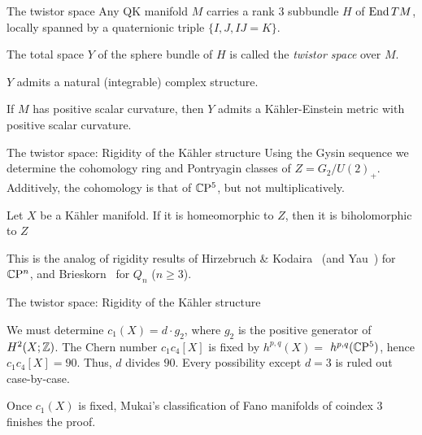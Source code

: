 \documentclass[11pt,parskip]{beamer}
\begin{document}
\begin{frame}{The twistor space}
	Any QK manifold $M$ carries a rank 3 subbundle $H$ of $\operatorname{End} TM$, locally spanned by a quaternionic triple $\{I,J,IJ=K\}$.\pause
	
	\medskip
	
	\begin{mydef}
		The total space $Y$ of the sphere bundle of $H$ is called the \emph{twistor space} over $M$.
	\end{mydef}\pause

	\medskip
	
	\begin{thm}
		\begin{numberedlist}
			\item $Y$ admits a natural (integrable) complex structure.
			\item If $M$ has positive scalar curvature, then $Y$ admits a K\"ahler-Einstein metric with positive scalar curvature.
		\end{numberedlist}
	\end{thm}	
\end{frame}

\begin{frame}{The twistor space: Rigidity of the K\"ahler structure}
	Using the Gysin sequence we determine the cohomology ring and Pontryagin classes of $Z=G_2/U(2)_+$. Additively, the cohomology is that of $\mathbb{C}\mathrm{P}^5$, but not multiplicatively.\pause
	
	\bigskip 
	
	\begin{thm}
		Let $X$ be a K\"ahler manifold. If it is homeomorphic to $Z$, then it is biholomorphic to $Z$
	\end{thm}\pause
	
	\bigskip
	
	This is the analog of rigidity results of Hirzebruch \& Kodaira~\cite{HK1957} (and Yau~\cite{Yau1977}) for $\mathbb{C}\mathrm{P}^n$, and Brieskorn~\cite{Bri1964} for $Q_n$ ($n\geq 3$).
\end{frame}



\begin{frame}{The twistor space: Rigidity of the K\"ahler structure}
	\begin{myproof}
		We must determine $c_1(X)=d\cdot g_2$, where $g_2$ is the positive generator of $H^2(X;\mathbb{Z})$. The Chern number $c_1c_4[X]$ is fixed by $h^{p,q}(X)=$ $h^{p,q}(\mathbb{C}\mathrm{P}^5)$, hence $c_1c_4[X]=90$. Thus, $d$ divides $90$. Every possibility except $d=3$ is ruled out case-by-case.\pause
	
		\bigskip
		
		Once $c_1(X)$ is fixed, Mukai's classification of Fano manifolds of coindex $3$ finishes the proof.	
	\end{myproof}
\end{frame}
\end{document}

